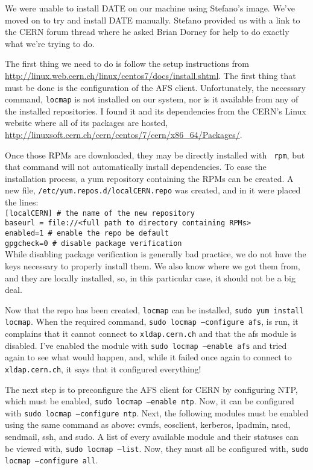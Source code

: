\documentclass[12pt]{article}
\begin{document}
\qq We were unable to install DATE on our machine using Stefano's image. We've moved on to try and install DATE manually. Stefano provided us with a link to the CERN forum thread where he asked Brian Dorney for help to do exactly what we're trying to do. 

\qq The first thing we need to do is follow the setup instructions from
\url{http://linux.web.cern.ch/linux/centos7/docs/install.shtml}. The first thing
that must be done is the configuration of the AFS client. Unfortunately, the
necessary command, {\tt locmap} is not installed on our system, nor is it
available from any of the installed repositories. I found it and its
dependencies from the CERN's Linux website where all of its packages are hosted,
\url{http://linuxsoft.cern.ch/cern/centos/7/cern/x86_64/Packages/}.

\qq Once those RPMs are downloaded, they may be directly installed with {\tt
  rpm}, but that command will not automatically install dependencies. To ease
the installation process, a yum repository containing the RPMs can be created. A
new file, {\tt /etc/yum.repos.d/localCERN.repo} was created, and in it were
placed the lines: \\
{\tt [localCERN] \# the name of the new repository} \\
{\tt baseurl = file://<full path to directory containing RPMs>} \\
{\tt enabled=1 \# enable the repo be default} \\
{\tt gpgcheck=0 \# disable package verification} \\
While disabling package verification is generally bad practice, we do not have
the keys necessary to properly install them. We also know where we got them
from, and they are locally installed, so, in this particular case, it should not
be a big deal.

\qq Now that the repo has been created, {\tt locmap} can be installed, {\tt sudo
  yum install locmap}. When the required command, {\tt sudo locmap --configure
  afs}, is run, it complains that it cannot connect to {\tt xldap.cern.ch} and
that the afs module is disabled. I've enabled the module with {\tt sudo locmap
  --enable afs} and tried again to see what would happen, and, while it failed
once again to connect to {\tt xldap.cern.ch}, it says that it configured
everything!

\qq The next step is to preconfigure the AFS client for CERN by configuring NTP,
which must be enabled, {\tt sudo locmap --enable ntp}. Now, it can be configured
with {\tt sudo locmap --configure ntp}. Next, the following modules must be
enabled using the same command as above: cvmfs, eosclient, kerberos, lpadmin,
nscd, sendmail, ssh, and sudo. A list of every available module and their
statuses can be viewed with, {\tt sudo locmap --list}. Now, they must all be
configured with, {\tt sudo locmap --configure all}. 
\end{document}
